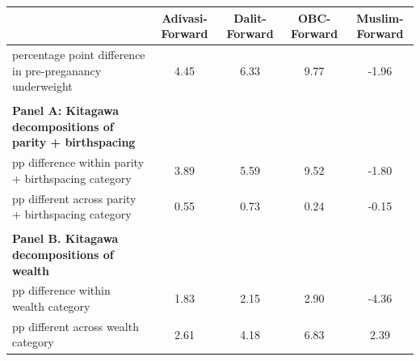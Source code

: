 \begin{tabular}{l*{4}{c}}
\hline\hline
            &\multicolumn{1}{c}{Adivasi-Forward}&\multicolumn{1}{c}{Dalit-Forward}&\multicolumn{1}{c}{OBC-Forward}&\multicolumn{1}{c}{Muslim-Forward}\\
\hline
\hline
percentage point difference in pre-preganancy underweight&        4.45&        6.33&        9.77&       -1.96\\
            &            &            &            &            \\
\textbf{Panel A: Kitagawa decompositions of parity + birthspacing}&            &            &            &            \\
pp difference within parity + birthspacing category&        3.89&        5.59&        9.52&       -1.80\\
pp different across parity + birthspacing category&        0.55&        0.73&        0.24&       -0.15\\
            &            &            &            &            \\
\textbf{Panel B. Kitagawa decompositions of wealth}&            &            &            &            \\
pp difference within wealth category&        1.83&        2.15&        2.90&       -4.36\\
pp different across wealth category&        2.61&        4.18&        6.83&        2.39\\
\hline\hline
\end{tabular}

